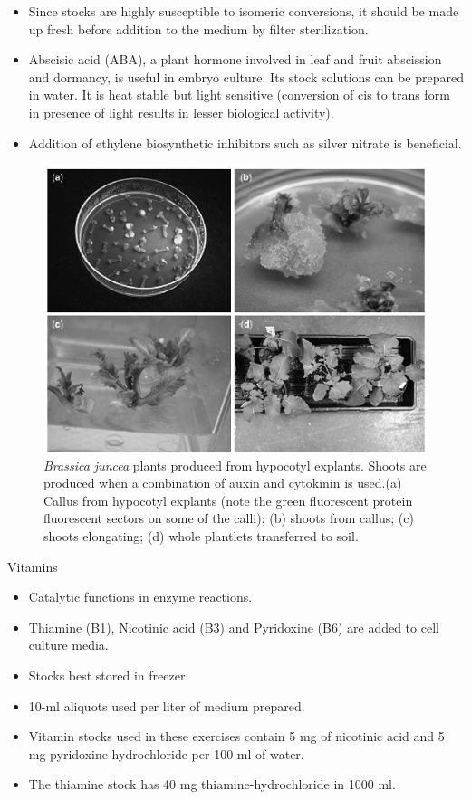 \documentclass[
  ignorenonframetext,
  aspectratio=169]{beamer}
\providecommand{\tightlist}{%
  \setlength{\itemsep}{0pt}\setlength{\parskip}{0pt}}
\begin{document}
\begin{frame}{}
\protect\hypertarget{section-6}{}
\begin{itemize}
\tightlist
\item
  Since stocks are highly susceptible to isomeric conversions, it should
  be made up fresh before addition to the medium by filter
  sterilization.
\item
  Abscisic acid (ABA), a plant hormone involved in leaf and fruit
  abscission and dormancy, is useful in embryo culture. Its stock
  solutions can be prepared in water. It is heat stable but light
  sensitive (conversion of cis to trans form in presence of light
  results in lesser biological activity).
\item
  Addition of ethylene biosynthetic inhibitors such as silver nitrate is
  beneficial.
\end{itemize}
\end{frame}

\begin{frame}{}
\protect\hypertarget{section-7}{}
\begin{figure}
\includegraphics[width=0.45\linewidth]{../images/stages_of_tc} \caption{\textit{Brassica juncea} plants produced from hypocotyl explants. Shoots are produced when a combination of auxin and cytokinin is used.\newline (a) Callus from hypocotyl explants (note the green fluorescent protein fluorescent sectors on some of the calli); (b) shoots from callus; (c) shoots elongating; (d) whole plantlets transferred to soil.}\label{fig:stages-of-tc}
\end{figure}
\end{frame}

\begin{frame}{Vitamins}
\protect\hypertarget{vitamins}{}
\begin{itemize}
\tightlist
\item
  Catalytic functions in enzyme reactions.
\item
  Thiamine (B1), Nicotinic acid (B3) and Pyridoxine (B6) are added to
  cell culture media.
\item
  Stocks best stored in freezer.
\item
  10-ml aliquots used per liter of medium prepared.
\item
  Vitamin stocks used in these exercises contain 5 mg of nicotinic acid
  and 5 mg pyridoxine-hydrochloride per 100 ml of water.
\item
  The thiamine stock has 40 mg thiamine-hydrochloride in 1000 ml.
\end{itemize}
\end{frame}
\end{document}
